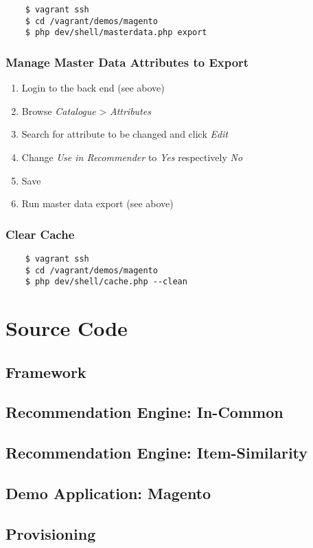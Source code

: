 \begin{verbatim}
    $ vagrant ssh
    $ cd /vagrant/demos/magento
    $ php dev/shell/masterdata.php export
\end{verbatim}

\subsubsection{Manage Master Data Attributes to Export}

\begin{enumerate}
\item Login to the back end (see above)
\item Browse \emph{Catalogue} > \emph{Attributes}
\item Search for attribute to be changed and click \emph{Edit}
\item Change \emph{Use in Recommender} to \emph{Yes} respectively \emph{No}
\item Save
\item Run master data export (see above)
\end{enumerate}

\subsubsection{Clear Cache}

\begin{verbatim}
    $ vagrant ssh
    $ cd /vagrant/demos/magento
    $ php dev/shell/cache.php --clean
\end{verbatim}


\section{Source Code}

\setmonofont{Consolas}

\subsection{Framework}

% 

\subsection{Recommendation Engine: In-Common}

% 

\subsection{Recommendation Engine: Item-Similarity}

% 

\subsection{Demo Application: Magento}

% 

\subsection{Provisioning}

% 
